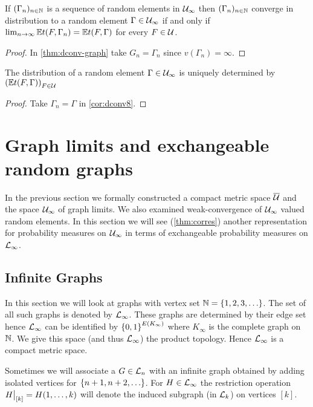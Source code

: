 \documentclass{article}
\begin{document}
\begin{cor}
  \label{cor:dconv8}
  If $(\Gamma_n)_{n \in \N}$ is a sequence of random elements in $\Ug_{\infty}$ then $(\Gamma_n)_{n \in \N}$ converge in distribution to a random element $\Gamma \in \Ug_{\infty}$ if and only if $\lim_{n \to \infty} \Ex t(F, \Gamma_n) = \Ex t(F, \Gamma)$ for every $F \in \Ug$.
\end{cor}
\begin{proof}
  In \autoref{thm:dconv-graph} take $G_n=\Gamma_n$ since $v(\Gamma_n) = \infty$.
\end{proof}
\begin{cor}
  The distribution of a random element $\Gamma \in \Ug_{\infty}$ is uniquely determined by $\left(\Ex t(F, \Gamma)\right)_{F \in \Ug}$
\end{cor}
\begin{proof}
  Take $\Gamma_n = \Gamma$ in \autoref{cor:dconv8}.
\end{proof}

\section{Graph limits and exchangeable random graphs}
\label{sec:sampling-distribution}

In the previous section we formally constructed a compact metric space $\Ug*$ and the space $\Ug_{\infty}$ of graph limits. We also examined weak-convergence of $\Ug_{\infty}$ valued random elements. In this section we will see (\autoref{thm:corres}) another representation for probability measures on $\Ug_{\infty}$ in terms of exchangeable probability measures on $\Lg_{\infty}$.

\subsection{Infinite Graphs}

In this section we will look at graphs with vertex set $\N = \set{1, 2, 3, \ldots}$.  The set of all such graphs is denoted by $\Lg_{\infty}$. These graphs are determined by their edge set hence $\Lg_{\infty}$ can be identified by $\left\{ 0,1 \right\}^{E(K_{\infty})}$ where $K_\infty$ is the complete graph on $\N$. We give this space (and thus $\Lg_{\infty}$) the product topology. Hence $\Lg_{\infty}$ is a compact metric space.

Sometimes we will associate a $G \in \Lg_{n}$ with an infinite graph obtained by adding isolated vertices for $\left\{ n+1, n+2, \ldots \right\}$. For $H \in \Lg_{\infty}$ the restriction operation $\restr{H}{[k]} = H(1,\dots,k)$ will denote the induced subgraph (in $\Lg_{k}$) on vertices $[k]$. 
\end{document}
